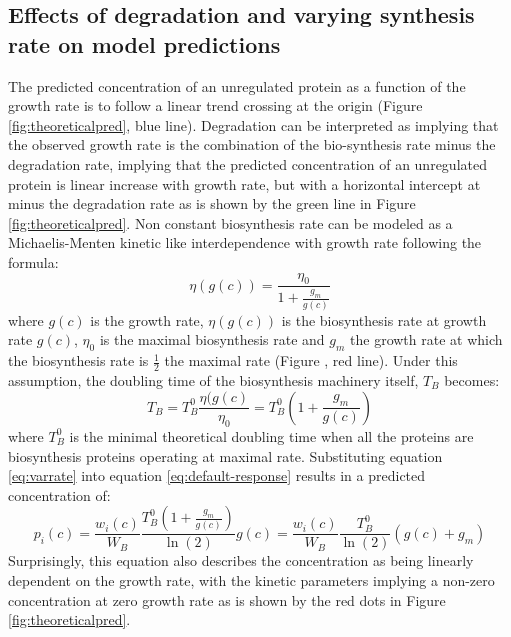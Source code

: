 \subsection{Effects of degradation and varying synthesis rate on model predictions}
\label{theoreticalintercep}
The predicted concentration of an unregulated protein as a function of the growth rate is to follow a linear trend crossing at the origin (Figure \ref{fig:theoreticalpred}, blue line).
Degradation can be interpreted as implying that the observed growth rate is the combination of the bio-synthesis rate minus the degradation rate, implying that the predicted concentration of an unregulated protein is linear increase with growth rate, but with a horizontal intercept at minus the degradation rate as is shown by the green line in Figure \ref{fig:theoreticalpred}.
Non constant biosynthesis rate can be modeled as a Michaelis-Menten kinetic like interdependence with growth rate following the formula:
\begin{equation}
\eta(g(c))=\frac{\eta_0}{1+\frac{g_m}{g(c)}}
\end{equation}
where $g(c)$ is the growth rate, $\eta(g(c))$ is the biosynthesis rate at growth rate $g(c)$, $\eta_0$ is the maximal biosynthesis rate and $g_m$ the growth rate at which the biosynthesis rate is $\frac{1}{2}$ the maximal rate (Figure , red line).
Under this assumption, the doubling time of the biosynthesis machinery itself, $T_B$ becomes:
\begin{equation}
\label{eq:varrate}
T_B=T_B^0\frac{\eta(g(c)}{\eta_0}=T_B^0(1+\frac{g_m}{g(c)})
\end{equation}
where $T_B^0$ is the minimal theoretical doubling time when all the proteins are biosynthesis proteins operating at maximal rate.
Substituting equation \ref{eq:varrate} into equation \ref{eq:default-response} results in a predicted concentration of:
\begin{equation}
p_i(c)=\frac{w_i(c)}{W_B}\frac{T_B^0(1+\frac{g_m}{g(c)})}{\ln(2)}g(c) = \frac{w_i(c)}{W_B}\frac{T_B^0}{\ln(2)}(g(c)+g_m)
\end{equation}
Surprisingly, this equation also describes the concentration as being linearly dependent on the growth rate, with the kinetic parameters implying a non-zero concentration at zero growth rate as is shown by the red dots in Figure \ref{fig:theoreticalpred}.
